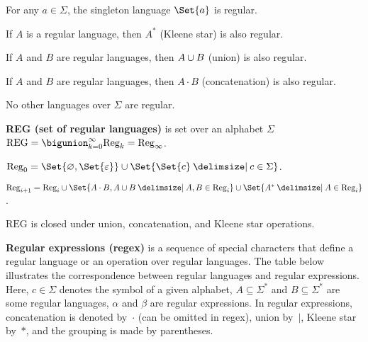 \documentclass[a4paper,10pt]{article}
\begin{document}
\begin{terms}
\begin{terms}
        \item For any $a \in \Sigma$, the singleton language $\Set{a}$ is regular.

        \item If $A$ is a regular language, then $A^*$ (Kleene star) is also regular.

        \item If $A$ and $B$ are regular languages, then $A \cup B$ (union) is also regular.

        \item If $A$ and $B$ are regular languages, then $A \cdot B$ (concatenation) is also regular.

        \item No other languages over $\Sigma$ are regular.
    \end{terms}

    \item \textbf{REG (set of regular languages)} is set over an alphabet $\Sigma$\\ $\mathrm{REG} = \bigunion_{k = 0}^{\infty} \mathrm{Reg}_{k} = \mathrm{Reg}_{\infty}$.

    \begin{terms}
        \item $\mathrm{Reg}_{0} = \Set{\emptyset, \Set{\varepsilon}} \union \Set{\Set{c} \given c \in \Sigma}$.

        \item $\mathrm{Reg}_{i + 1} = \mathrm{Reg}_{i} \union \Set{A \cdot B, A \union B \given A,B \in \mathrm{Reg}_{i}} \union \Set{A^* \given A \in \mathrm{Reg}_{i}}$.
    \end{terms}

    \item $\mathrm{REG}$ is closed under union, concatenation, and Kleene star operations.

    \item \textbf{Regular expressions (regex)} is a sequence of special characters that define a regular language or an operation over regular languages.
    The table below illustrates the correspondence between regular languages and regular expressions.
    Here, $c \in \Sigma$ denotes the symbol of a given alphabet, $A \subseteq \Sigma^*$ and $B \subseteq \Sigma^*$ are some regular languages, $\alpha$ and $\beta$ are regular expressions.
    In regular expressions, concatenation is denoted by~$\cdot$ (can be omitted in regex), union by~$|$, Kleene star by~$*$, and the grouping is made by parentheses.


\end{terms}
\end{document}
